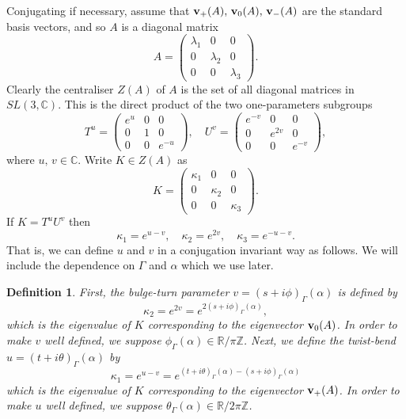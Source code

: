 \documentclass[11pt]{amsart}
\newtheorem{definition}[theorem]{Definition}
\numberwithin{equation}{section}
\begin{document}
Conjugating if necessary, assume that ${\bf v}_+(A),\,{\bf v}_0(A),\,{\bf v}_-(A)$ are the standard basis vectors, and so
$A$ is a diagonal matrix
$$
	A=\left(\begin{matrix} \lambda_1 & 0 & 0 \\ 0 & \lambda_2 & 0 \\ 0 & 0 & \lambda_3		
	\end{matrix}\right).
$$
Clearly the centraliser $Z(A)$ of $A$ is the set of all diagonal matrices in $SL(3,\mathbb{C})$. This is the direct product of the 
two one-parameters subgroups
\begin{equation}
	T^u=\left(\begin{array}{ccc}
		e^{u} & 0 & 0 \\
		0 & 1 & 0 \\
		0 & 0 & e^{-u}
	\end{array}\right), \quad 
	U^v=\left(\begin{array}{ccc}
		e^{-v} & 0 & 0 \\
		0 & e^{2v} & 0 \\
		0 & 0 & e^{-v}
	\end{array}\right), \label{eq:tbbt}
\end{equation}
where $u,\,v\in\mathbb{C}$. Write $K\in Z(A)$ as 
$$
K=\left(\begin{matrix} \kappa_1 & 0 & 0 \\ 0 & \kappa_2 & 0 \\ 0 & 0 & \kappa_3 \end{matrix}\right).
$$
If $K=T^uU^v$ then 
$$
\kappa_1=e^{u-v},\quad \kappa_2=e^{2v},\quad \kappa_3=e^{-u-v}.
$$
That is, we can define $u$ and $v$ in a conjugation invariant way as follows. 
We will include the dependence on $\Gamma$ and $\alpha$ which we use later.

\begin{definition}\label{def-t-b-b-t}
First, the {\em bulge-turn} parameter 
$v=(s+i\phi)_\Gamma(\alpha)$ is defined by 
$$
\kappa_2=e^{2v}=e^{2(s+i\phi)_\Gamma(\alpha)},
$$ 
which is the eigenvalue of $K$ corresponding to the eigenvector ${\bf v}_0(A)$. 
In order to make $v$ well defined, we suppose $\phi_\Gamma(\alpha)\in{\mathbb R}/\pi{\mathbb Z}$. Next, we define
the {\em twist-bend} $u=(t+i\theta)_\Gamma(\alpha)$ by 
$$
\kappa_1=e^{u-v}=e^{(t+i\theta)_\Gamma(\alpha)-(s+i\phi)_\Gamma(\alpha)}
$$
which is the eigenvalue of $K$ corresponding to the eigenvector ${\bf v}_+(A)$. In order to make $u$ well defined, 
we suppose $\theta_\Gamma(\alpha)\in{\mathbb R}/2\pi{\mathbb Z}$. 
\end{definition}
\end{document}
